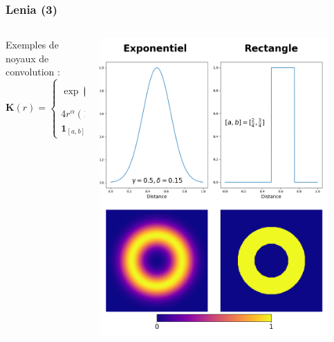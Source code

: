 \documentclass[aspectratio=43]{beamer}
\begin{document}
\begin{frame}
	\frametitle{Lenia (3)}

	\begin{columns}
		\begin{column}{0.5\textwidth}
			Exemples de noyaux de convolution :
			\[
				\mathbf{K}(r) = 
				\begin{cases}	
					\exp\left(-\displaystyle\frac{(r - \gamma)^2}{2\delta^2}\right) ; \gamma, \delta \in \mathbb{R} \\
					4r^\alpha(1-r)^\alpha ; \alpha \in \mathbb{N}^* \\
					\mathbf{1}_{[a, b]}(r)
				\end{cases}
			\]
		\end{column}
		\begin{column}{0.5\textwidth}
			\begin{center}
				\includegraphics[width=0.9\textwidth]{plot_convolution_kernels.png}
			\end{center}
		\end{column}
	\end{columns}

\end{frame}
\end{document}
